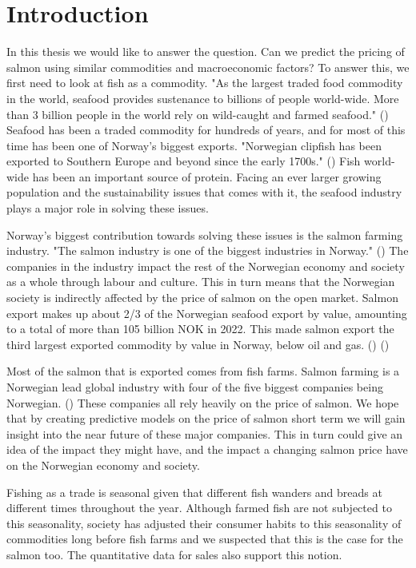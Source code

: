 \section{Introduction}

In this thesis we would like to answer the question. 
Can we predict the pricing of salmon using similar commodities and macroeconomic factors? To answer this, we first need to look at fish as a commodity. "As the largest traded food commodity in the world, seafood provides sustenance to billions of people world-wide. More than 3 billion people in the world rely on wild-caught and farmed seafood." (\cite{wwf_2019}) Seafood has been a traded commodity for hundreds of years, and for most of this time has been one of Norway's biggest exports. "Norwegian clipfish has been exported to Southern Europe and beyond since the early 1700s." (\cite{seafood_from_norway_clipfish}) Fish world-wide has been an important source of protein. Facing an ever larger growing population and the sustainability issues that comes with it, the seafood industry plays a major role in solving these issues.

Norway's biggest contribution towards solving these issues is the salmon farming industry. "The salmon industry is one of the biggest industries in Norway." (\cite{Johansen_et_al_2019}) The companies in the industry impact the rest of the Norwegian economy and society as a whole through labour and culture. This in turn means that the Norwegian society is indirectly affected by the price of salmon on the open market. Salmon export makes up about 2/3 of the Norwegian seafood export by value, amounting to a total of more than 105 billion NOK in 2022. This made salmon export the third largest exported commodity by value in Norway, below oil and gas. (\cite{e24_gasprice_2023}) (\cite{seafood_nokkeltall})

Most of the salmon that is exported comes from fish farms. Salmon farming is a Norwegian lead global industry with four of the five biggest companies being Norwegian. (\cite{ilaks_2020}) These companies all rely heavily on the price of salmon. We hope that by creating predictive models on the price of salmon short term we will gain insight into the near future of these major companies. This in turn could give an idea of the impact they might have, and the impact a changing salmon price have on the Norwegian economy and society.

Fishing as a trade is seasonal given that different fish wanders and breads at different times throughout the year. Although farmed fish are not subjected to this seasonality, society has adjusted their consumer habits to this seasonality of commodities long before fish farms and we suspected that this is the case for the salmon too. The quantitative data for sales also support this notion.

